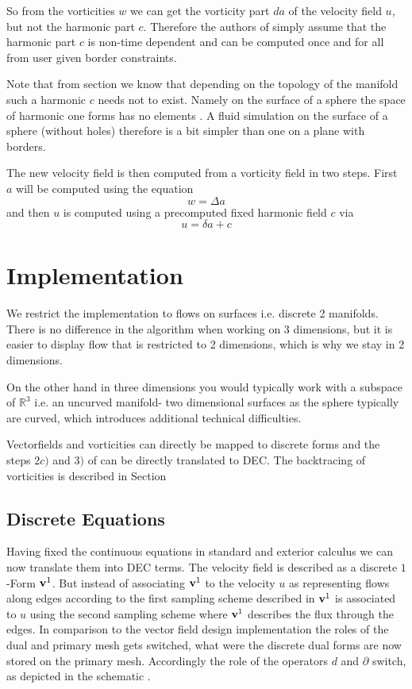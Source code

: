 So from the vorticities $w$ we can get the vorticity part $da$ of the velocity field $u$, but not the harmonic part $c$. Therefore the authors of \note{[...]} simply assume that the harmonic part $c$ is non-time dependent and can be computed once and for all from user given border constraints.

Note that from section  we know that depending on the topology of the manifold such a harmonic $c$ needs not to exist. Namely on the surface of a sphere the space of harmonic one forms has no elements . A fluid simulation on the surface of a sphere (without holes) therefore is a bit simpler than one on a plane with borders. 

The new velocity field is then computed from a vorticity field in two steps. First $a$ will be computed using the equation
\[w = \Delta a\]
and then $u$ is computed using a precomputed fixed harmonic field $c$ via
\[u = \delta a + c\]

\section{Implementation}
We restrict the implementation to flows on surfaces i.e. discrete 2 manifolds. There is no difference in the algorithm when working on 3 dimensions, but it is easier to display flow that is restricted to 2 dimensions, which is why we stay in 2 dimensions. 

On the other hand in three dimensions you would typically work with a subspace of $\mathbb R^3$ i.e. an uncurved manifold- two dimensional surfaces as the sphere typically are curved, which introduces additional technical difficulties.

Vectorfields and vorticities can directly be mapped to discrete forms and the steps $2 c)$ and $3)$ of  can be directly translated to DEC. The backtracing of vorticities is described in Section 

\subsection{Discrete Equations}
Having fixed the continuous equations in standard and exterior calculus we can now translate them into DEC terms. 
The velocity field is described as a discrete  $1$-Form $\textbf{v}^1$. But instead of associating $\textbf{v}^1$ to the velocity $u$ as representing flows along edges according to the first sampling scheme described in  $\textbf{v}^1$ is associated to $u$ using the second sampling scheme  where $\textbf{v}^1$ describes the flux through the edges. In comparison to the vector field design implementation the roles of the dual and primary mesh gets switched, what were the discrete dual forms are now stored on the primary mesh. Accordingly the role of the operators $d$ and $\partial$ switch, as depicted in the schematic .

